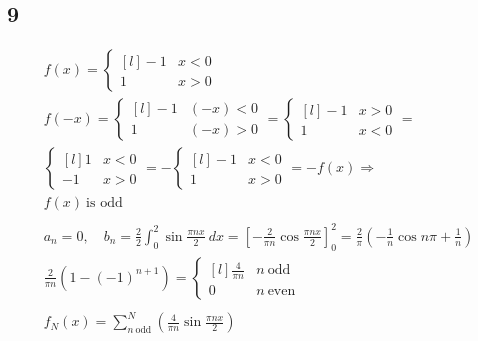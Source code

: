 \subsection*{9}


\begin{gather*}
	f(x) = \left\{\begin{matrix*}[l]
		-1	& x < 0 \\
		1	& x > 0
	\end{matrix*}\right.
	\\
	f(-x) = \left\{\begin{matrix*}[l]
		-1	& (-x) < 0 \\
		1	& (-x) > 0
	\end{matrix*}\right. =
	\left\{\begin{matrix*}[l]
		-1	& x > 0 \\
		1	& x < 0
	\end{matrix*}\right. =
	\\
	\left\{\begin{matrix*}[l]
		1	& x < 0 \\
		-1	& x > 0
	\end{matrix*}\right. =
	- \left\{\begin{matrix*}[l]
		-1	& x < 0 \\
		1	& x > 0
	\end{matrix*}\right. =
	-f(x) \Rightarrow \\
	f(x)\ \text{is odd}
	\\
	\\
	a_n = 0, \quad
	b_n = \frac{2}{2} \int_0^2{\sin{\frac{\pi n x}{2}}\ d x} =
	\left[
		-\frac{2}{\pi n} \cos{\frac{\pi n x}{2}}
	\right]_0^2 =
	\frac{2}{\pi} \left(
		-\frac{1}{n} \cos{n \pi} +
		\frac{1}{n}
	\right)
	\\
	\frac{2}{\pi n} \left(
		1 - (-1)^{n + 1}
	\right) =
	\left\{\begin{matrix*}[l]
		\frac{4}{\pi n}	& n\ \text{odd} \\
		0				& n\ \text{even}
	\end{matrix*}
	\right.
	\\
	\\
	f_N(x) = \sum_{n\ \text{odd}}^N{\left(\frac{4}{\pi n} \sin{\frac{\pi n x}{2}}\right)}
\end{gather*}
\bigskip

\bigskip
\\


